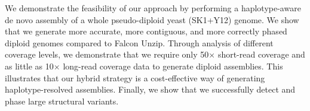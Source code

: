 
We demonstrate the feasibility of our approach by performing a haplotype-aware de novo assembly of a whole pseudo-diploid yeast (SK1+Y12) genome.
We show that we generate more accurate, more contiguous, and more correctly phased diploid genomes compared to Falcon Unzip.
Through analysis of different coverage levels, we demonstrate that we require only 50$\times$ short-read coverage and as little as 10$\times$ long-read coverage data to generate diploid assemblies.
This illustrates that our hybrid strategy is a cost-effective way of generating haplotype-resolved assemblies.
Finally, we show that we successfully detect and phase large structural variants.


